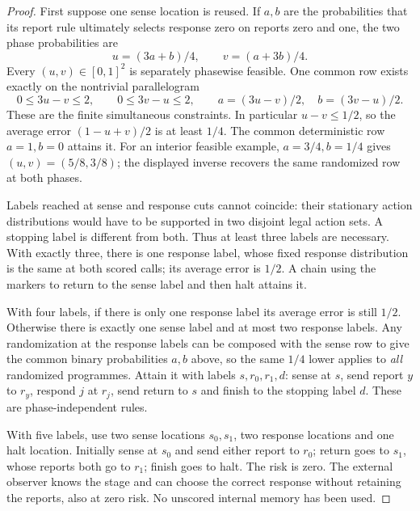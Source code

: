 \begin{proof}
First suppose one sense location is reused. If $a,b$ are the probabilities that its report rule ultimately selects response zero on reports zero and one, the two phase probabilities are
\[
 u=(3a+b)/4,\qquad v=(a+3b)/4.
\]
Every $(u,v)\in[0,1]^2$ is separately phasewise feasible. One common row exists exactly on the nontrivial parallelogram
\begin{equation}\label{eq:reuse_polytope}
 0\le3u-v\le2,\qquad0\le3v-u\le2,
 \qquad a=(3u-v)/2,\quad b=(3v-u)/2.
\end{equation}
These are the finite simultaneous constraints. In particular $u-v\le1/2$, so the average error $(1-u+v)/2$ is at least $1/4$. The common deterministic row $a=1,b=0$ attains it. For an interior feasible example, $a=3/4,b=1/4$ gives $(u,v)=(5/8,3/8)$; the displayed inverse recovers the same randomized row at both phases.

Labels reached at sense and response cuts cannot coincide: their stationary action distributions would have to be supported in two disjoint legal action sets. A stopping label is different from both. Thus at least three labels are necessary. With exactly three, there is one response label, whose fixed response distribution is the same at both scored calls; its average error is $1/2$. A chain using the markers to return to the sense label and then halt attains it.

With four labels, if there is only one response label its average error is still $1/2$. Otherwise there is exactly one sense label and at most two response labels. Any randomization at the response labels can be composed with the sense row to give the common binary probabilities $a,b$ above, so the same $1/4$ lower applies to \emph{all} randomized programmes. Attain it with labels $s,r_0,r_1,d$: sense at $s$, send report $y$ to $r_y$, respond $j$ at $r_j$, send return to $s$ and finish to the stopping label $d$. These are phase-independent rules.

With five labels, use two sense locations $s_0,s_1$, two response locations and one halt location. Initially sense at $s_0$ and send either report to $r_0$; return goes to $s_1$, whose reports both go to $r_1$; finish goes to halt. The risk is zero. The external observer knows the stage and can choose the correct response without retaining the reports, also at zero risk. No unscored internal memory has been used.
\end{proof}

